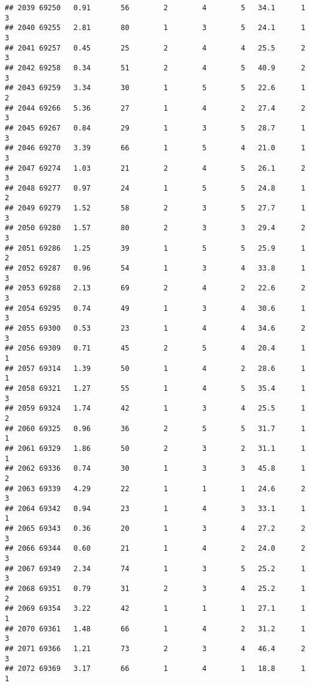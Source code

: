 \documentclass[
]{article}
\begin{document}
\begin{verbatim}
## 2039 69250   0.91       56        2        4        5   34.1      1      3
## 2040 69255   2.81       80        1        3        5   24.1      1      3
## 2041 69257   0.45       25        2        4        4   25.5      2      3
## 2042 69258   0.34       51        2        4        5   40.9      2      3
## 2043 69259   3.34       30        1        5        5   22.6      1      2
## 2044 69266   5.36       27        1        4        2   27.4      2      3
## 2045 69267   0.84       29        1        3        5   28.7      1      3
## 2046 69270   3.39       66        1        5        4   21.0      1      3
## 2047 69274   1.03       21        2        4        5   26.1      2      3
## 2048 69277   0.97       24        1        5        5   24.8      1      2
## 2049 69279   1.52       58        2        3        5   27.7      1      3
## 2050 69280   1.57       80        2        3        3   29.4      2      3
## 2051 69286   1.25       39        1        5        5   25.9      1      2
## 2052 69287   0.96       54        1        3        4   33.8      1      3
## 2053 69288   2.13       69        2        4        2   22.6      2      3
## 2054 69295   0.74       49        1        3        4   30.6      1      3
## 2055 69300   0.53       23        1        4        4   34.6      2      3
## 2056 69309   0.71       45        2        5        4   20.4      1      1
## 2057 69314   1.39       50        1        4        2   28.6      1      1
## 2058 69321   1.27       55        1        4        5   35.4      1      3
## 2059 69324   1.74       42        1        3        4   25.5      1      2
## 2060 69325   0.96       36        2        5        5   31.7      1      1
## 2061 69329   1.86       50        2        3        2   31.1      1      1
## 2062 69336   0.74       30        1        3        3   45.8      1      2
## 2063 69339   4.29       22        1        1        1   24.6      2      3
## 2064 69342   0.94       23        1        4        3   33.1      1      1
## 2065 69343   0.36       20        1        3        4   27.2      2      3
## 2066 69344   0.60       21        1        4        2   24.0      2      3
## 2067 69349   2.34       74        1        3        5   25.2      1      3
## 2068 69351   0.79       31        2        3        4   25.2      1      2
## 2069 69354   3.22       42        1        1        1   27.1      1      1
## 2070 69361   1.48       66        1        4        2   31.2      1      3
## 2071 69366   1.21       73        2        3        4   46.4      2      3
## 2072 69369   3.17       66        1        4        1   18.8      1      1

\end{verbatim}
\end{document}
